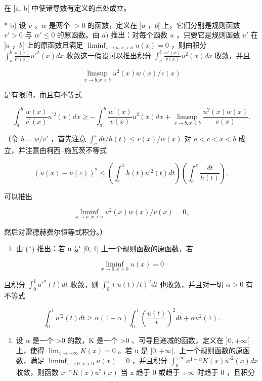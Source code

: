 在 {]}a, b{[} 中使诸导数有定义的点处成立。

* b) 设 \(v\) ，\(w\) 是两个 \(> 0\) 的函数，定义在 \(]a\) ，\(b[\) 上，它们分别是规则函数 \(v' > 0\) 与 \(w' \leqslant 0\) 的原函数。由 \(a)\) 推出：对每个函数 \(u\) ，只要它是规则函数 \(u'\) 在 \(]a\) ，\(b[\) 上的原函数且满足 \(\liminf_{x \to a, x > a} u(x) = 0\) ，则由积分 \(\int_{a}^{b} \frac{w(x)}{v'(x)} u'^2(x) dx\) 收敛这一假设可以推出积分 \(\int_{a}^{b} \frac{w'(x)}{v(x)} u^2(x) dx\) 收敛，并且

\[
\limsup _ {x \to b, x <   b} u ^ {2} (x) w (x) / v (x)
\]

是有限的，而且有不等式

\[
\int_ {a} ^ {b} \frac {w (x)}{v ^ {\prime} (x)} u ^ {\prime 2} (x) d x \geqslant - \int_ {a} ^ {b} \frac {w ^ {\prime} (x)}{v (x)} u ^ {2} (x) d x + \operatorname * {l i m s u p} _ {x \to b, x <   b} \frac {u ^ {2} (x) w (x)}{v (x)}.\tag{*}
\]

（令 \(h = w / v'\) ，首先注意 \(\int_{c}^{x} dt / h(t) \leqslant v(x) / w(x)\) 对 \(a < c < x < b\) 成立，并注意由柯西–施瓦茨不等式

\[
(u (x) - u (c)) ^ {2} \leqslant \left(\int_ {c} ^ {x} h (t) u ^ {\prime 2} (t) d t\right) \left(\int_ {c} ^ {x} \frac {d t}{h (t)}\right),\tag{**}
\]

可以推出

\[
\liminf _ {x \to a, x > a} u ^ {2} (x) w (x) / v (x) = 0,
\]

然后对雷德赫费尔恒等式积分。）

\begin{enumerate}
\def\labelenumi{\alph{enumi})}
\setcounter{enumi}{2}
\tightlist
\item
  由 (*) 推出：若 u 是 {]}0, 1{]} 上一个规则函数的原函数，若
\end{enumerate}

\[
\liminf _ {x \to 0, x > 0} u (x) = 0
\]

且积分 \(\int_0^1 u'^2 (t)dt\) 收敛，则 \(\int_0^1 (u(t) / t)^2 dt\) 也收敛，并且对一切 \(\alpha > 0\) 有不等式

\[
\int_ {0} ^ {1} u ^ {\prime 2} (t) d t \geqslant \alpha (1 - \alpha) \int_ {0} ^ {1} \left(\frac {u (t)}{t}\right) ^ {2} d t + \alpha u ^ {2} (1).
\]

\begin{enumerate}
\def\labelenumi{\alph{enumi})}
\setcounter{enumi}{3}
\tightlist
\item
  设 \(\alpha\) 是一个 \textgreater0 的数，K 是一个 \textgreater0 、可导且递减的函数，定义在 \(]0, +\infty[\) 上，使得 \(\lim_{x \to +\infty} K(x) = 0\) 。若 u 是 \(]0, +\infty[,\) 上一个规则函数的原函数，满足 \(\liminf_{x \to 0, x > 0} u(x) = 0\) ，并且积分 \(\int_{0}^{+\infty} x^{1-\alpha} K(x) u'^{2}(x) dx\) 收敛，则函数 \(x^{-\alpha} K(x) u^{2}(x)\) 当 x 趋于 0 或趋于 \(+\infty\) 时趋于 0 ，且积分
\end{enumerate}

